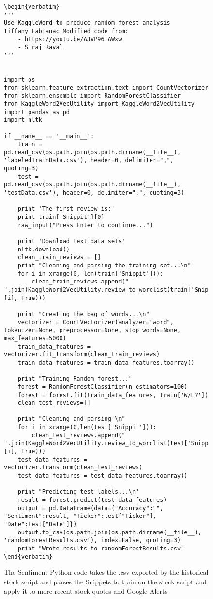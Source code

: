 \documentclass[sigconf]{acmart}
\begin{document}
\begin{figure}[htb]
\begin{lstlisting}
\begin{verbatim}
'''
Use KaggleWord to produce random forest analysis
Tiffany Fabianac Modified code from:
    - https://youtu.be/AJVP96tAWxw
    - Siraj Raval
'''


import os
from sklearn.feature_extraction.text import CountVectorizer
from sklearn.ensemble import RandomForestClassifier
from KaggleWord2VecUtility import KaggleWord2VecUtility
import pandas as pd
import nltk

if __name__ == '__main__':
    train = pd.read_csv(os.path.join(os.path.dirname(__file__), 'labeledTrainData.csv'), header=0, delimiter=",", quoting=3)
    test = pd.read_csv(os.path.join(os.path.dirname(__file__), 'testData.csv'), header=0, delimiter=",", quoting=3)

    print 'The first review is:'
    print train['Snippit'][0]
    raw_input("Press Enter to continue...")

    print 'Download text data sets'
    nltk.download()
    clean_train_reviews = []
    print "Cleaning and parsing the training set...\n"
    for i in xrange(0, len(train['Snippit'])):
        clean_train_reviews.append(" ".join(KaggleWord2VecUtility.review_to_wordlist(train['Snippit'][i], True)))

    print "Creating the bag of words...\n"
    vectorizer = CountVectorizer(analyzer="word", tokenizer=None, preprocessor=None, stop_words=None, max_features=5000)
    train_data_features = vectorizer.fit_transform(clean_train_reviews)
    train_data_features = train_data_features.toarray()

    print "Training Random forest..."
    forest = RandomForestClassifier(n_estimators=100)
    forest = forest.fit(train_data_features, train['W/L?'])
    clean_test_reviews=[]

    print "Cleaning and parsing \n"
    for i in xrange(0,len(test['Snippit'])):
        clean_test_reviews.append(" ".join(KaggleWord2VecUtility.review_to_wordlist(test['Snippit'][i], True)))
    test_data_features = vectorizer.transform(clean_test_reviews)
    test_data_features = test_data_features.toarray()

    print "Predicting test labels...\n"
    result = forest.predict(test_data_features)
    output = pd.DataFrame(data={"Accuracy":"", "Sentiment":result, "Ticker":test["Ticker"], "Date":test["Date"]})
    output.to_csv(os.path.join(os.path.dirname(__file__), 'randomForestResults.csv'), index=False, quoting=3)
    print "Wrote results to randomForestResults.csv"
\end{verbatim}
\end{lstlisting}
\caption{The Sentiment Python code takes the .csv exported by the historical stock script and parses the Snippets to train on the stock script and apply it to more recent stock quotes and Google Alerts}\label{c:sentiment}
\end{figure}
\end{document}
